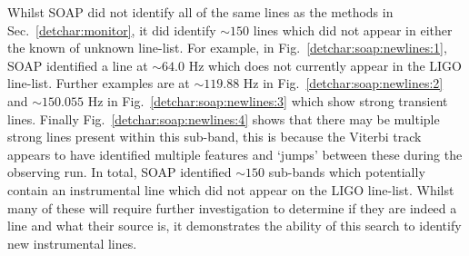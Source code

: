 Whilst SOAP did not identify all of the same lines as the methods in Sec.~\ref{detchar:monitor}, it did identify $\sim 150$ lines which did not appear in either the known of unknown line-list.
For example, in Fig.~\ref{detchar:soap:newlines:1}, SOAP identified a line at $\sim 64.0$ Hz which does not currently appear in the \gls{LIGO} line-list.
Further examples are at $\sim 119.88$ Hz in Fig.~\ref{detchar:soap:newlines:2} and $\sim 150.055$ Hz in Fig.~\ref{detchar:soap:newlines:3} which show strong transient lines. Finally Fig.~\ref{detchar:soap:newlines:4} shows that there may be multiple strong lines present within this sub-band, this is because the Viterbi track appears to have identified multiple features and `jumps' between these during the observing run.
In total, SOAP identified $\sim 150$ sub-bands which potentially contain an instrumental line which did not appear on the \gls{LIGO} line-list. 
Whilst many of these will require further investigation to determine if they are indeed a line and what their source is, it demonstrates the ability of this search to identify new instrumental lines.

